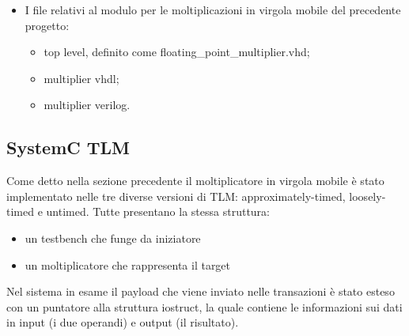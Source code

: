 \documentclass[]{IEEEtran}
\begin{document}
\begin{itemize}
		Il mapping tra le porte del wrapper e del moltiplicatore \`e il seguente:
		\begin{itemize}
			\item \textit{clk} nel moltiplicatore corrisponde al \textit{pclk} del wrapper (rispetto alla versione implementata nel precedente progetto, \`e stato cambiato il tipo di dato del clock, da bit a std\_logic);
			\item \textit{ready} nel moltiplicatore corrisponde al \textit{ready} del wrapper;
			\item \textit{VHDL\_in} nel moltiplicatore corrisponde al \textit{VHDL\_in} del wrapper;
			\item \textit{verilog\_in} nel moltiplicatore corrisponde al \textit{verilog\_in} del wrapper;
			\item \textit{eccezione\_out} nel moltiplicatore corrisponde ad \textit{eccezione\_out} del wrapper;
			\item \textit{done} nel moltiplicatore corrisponde al \textit{done} del wrapper;
			\item \textit{result} nel moltiplicatore corrisponde al \textit{result} del wrapper;
			\item \textit{rst} nel moltiplicatore corrisponde al \textit{presetn} del wrapper (come per il clock \`e stato cambiato il tipo di dato rispetto al precedente progetto).
		\end{itemize}
		
		\item I file relativi al modulo per le moltiplicazioni in virgola mobile del precedente progetto:
		\begin{itemize}
			\item top level, definito come floating\_point\_multiplier.vhd;
			\item multiplier vhdl;
			\item multiplier verilog.
		\end{itemize}
	\end{itemize}

	\subsection{SystemC TLM}
	
	Come detto nella sezione precedente il moltiplicatore in virgola mobile \`e stato implementato nelle tre diverse versioni di TLM: approximately-timed, loosely-timed e untimed. Tutte presentano la stessa struttura:
	\begin{itemize}
		\item un testbench che funge da iniziatore
		\item un moltiplicatore che rappresenta il target
	\end{itemize}
	Nel sistema in esame il payload che viene inviato nelle transazioni \`e stato esteso con un puntatore alla struttura iostruct, la quale contiene le informazioni sui dati in input (i due operandi) e output (il risultato). 
\end{document}

